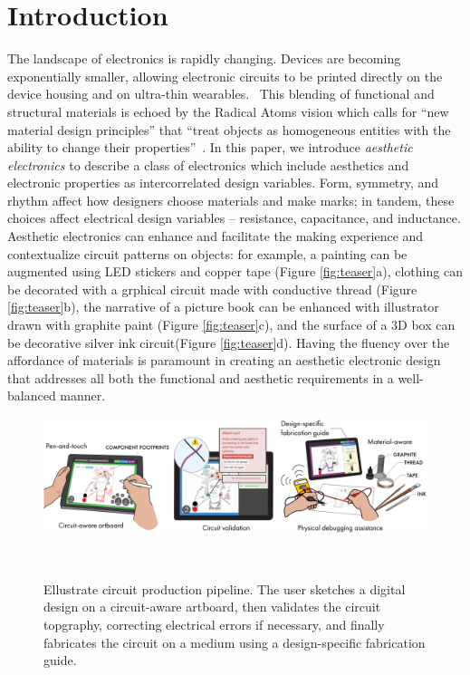 \documentclass{sigchi}
\begin{document}

\section{Introduction}
The landscape of electronics is rapidly changing. Devices are becoming exponentially smaller, allowing electronic circuits to be printed directly on the device housing and on ultra-thin wearables.~\cite{MacDonald:2014ju,Kim:2014iq} %
This blending of functional and structural materials is echoed by the Radical Atoms vision which calls for ``new material design principles'' that ``treat objects as homogeneous entities with the ability to change their properties''~\cite{Ishii:2012fg}.  
In this paper, we introduce \textit{aesthetic electronics} to describe a class of electronics which include aesthetics and electronic properties as intercorrelated design variables. Form, symmetry, and rhythm affect how designers choose materials and make marks; in tandem, these choices affect electrical design variables -- resistance, capacitance, and inductance.
Aesthetic electronics can enhance and facilitate the making experience and contextualize circuit patterns on objects: for example, a painting can be augmented using LED stickers and copper tape (Figure \ref{fig:teaser}a), clothing can be decorated with a grphical circuit made with conductive thread (Figure \ref{fig:teaser}b), the narrative of a picture book can be enhanced with illustrator drawn with graphite paint (Figure \ref{fig:teaser}c), and the surface of a 3D box can be decorative silver ink circuit(Figure \ref{fig:teaser}d).
Having the fluency over the affordance of materials is paramount in creating an aesthetic electronic design that addresses all both the functional and aesthetic requirements in a well-balanced manner. 

\begin{figure}[ht]
 \vspace{-16pt}
\centering
  \includegraphics[width=\linewidth]{figures/ellustrate_system.pdf}
  \caption{Ellustrate circuit production pipeline. The user sketches a digital design on a circuit-aware artboard, then validates the circuit topgraphy, correcting electrical errors if necessary, and finally fabricates the circuit on a medium using a design-specific fabrication guide.}~\label{fig:process_flow}
  \vspace{-16pt}
\end{figure}
\end{document}
